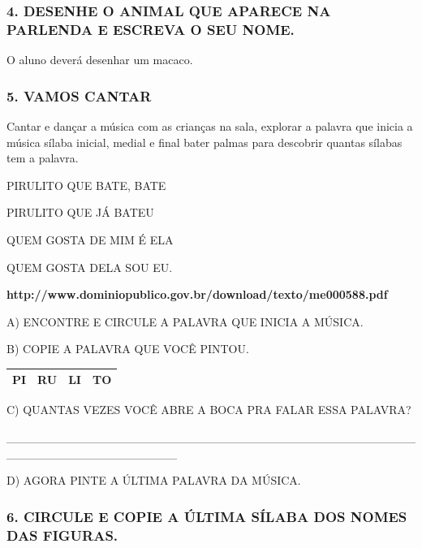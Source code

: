 \subsubsection{4. DESENHE O ANIMAL QUE APARECE NA PARLENDA E ESCREVA O
SEU
NOME.}\label{desenhe-o-animal-que-aparece-na-parlenda-e-escreva-o-seu-nome.}

O aluno deverá desenhar um macaco.

\subsubsection{5. VAMOS CANTAR}\label{vamos-cantar}

Cantar e dançar a música com as crianças na sala, explorar a palavra que
inicia a música sílaba inicial, medial e final bater palmas para
descobrir quantas sílabas tem a palavra.

PIRULITO QUE BATE, BATE

PIRULITO QUE JÁ BATEU

QUEM GOSTA DE MIM É ELA

QUEM GOSTA DELA SOU EU.

\textbf{http://www.dominiopublico.gov.br/download/texto/me000588.pdf}

A) ENCONTRE E CIRCULE A PALAVRA QUE INICIA A MÚSICA.

B) COPIE A PALAVRA QUE VOCÊ PINTOU.

\begin{longtable}[]{@{}llll@{}}
\toprule
\textbf{PI} & \textbf{RU} & \textbf{LI} & \textbf{TO}\tabularnewline
\bottomrule
\end{longtable}

C) QUANTAS VEZES VOCÊ ABRE A BOCA PRA FALAR ESSA PALAVRA?

\_\_\_\_\_\_\_\_\_\_\_\_\_\_\_\_\_\_\_\_\_\_\_\_\_\_\_\_\_\_\_\_\_\_\_\_\_\_\_\_\_\_\_\_\_\_\_\_\_\_\_\_\_\_\_\_\_\_\_\_\_\_\_\_\_\_\_\_

D) AGORA PINTE A ÚLTIMA PALAVRA DA MÚSICA.

\subsubsection{6. CIRCULE E COPIE A ÚLTIMA SÍLABA DOS NOMES DAS
FIGURAS.}\label{circule-e-copie-a-uxfaltima-suxedlaba-dos-nomes-das-figuras.}

